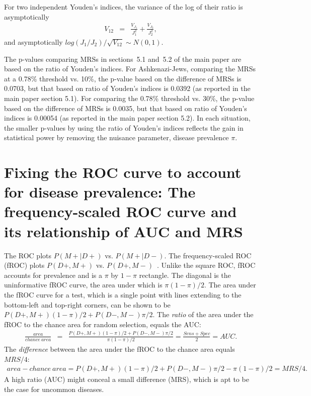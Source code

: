 \documentclass[AMA,STIX1COL]{WileyNJD-v2}
\begin{document}
For two independent Youden's indices, the variance of the log of their ratio is asymptotically
\begin{eqnarray*}
	V_{12} &=& \frac{V_{J_1}}{J_1^2} + \frac{V_{J_2}}{J_2^2},
\end{eqnarray*}
and asymptotically $log(J_1/J_2)/\sqrt{V_{12}}\sim N(0,1)$.

The p-values comparing MRSs in sections~5.1 and~5.2 of the main paper are based on the ratio of Youden's indices.  For Ashkenazi-Jews, comparing the MRSs at a 0.78\% threshold vs. 10\%, the p-value based on the difference of MRSs is 0.0703, but that based on ratio of Youden's indices is 0.0392 (as reported in the main paper section 5.1).  For comparing the 0.78\% threshold vs. 30\%, the p-value based on the difference of MRSs is 0.0035, but that based on ratio of Youden's indices is 0.00054 (as reported in the main paper section 5.2).  In each situation, the smaller p-values by using the ratio of Youden's indices reflects the gain in statistical power by removing the nuisance parameter, disease prevalence $\pi$.


\section{Fixing the ROC curve to account for disease prevalence: The frequency-scaled ROC curve and its relationship of AUC and MRS}
\label{fROC}

The ROC plots $P(M+|D+)$ vs. $P(M+|D-)$.  The frequency-scaled ROC (fROC) plots $P(D+,M+)$ vs. $P(D+,M-)$~\citep{Hilden1991}.  Unlike the square ROC, fROC accounts for prevalence and is a $\pi$ by $1-\pi$ rectangle.  The diagonal is the uninformative fROC curve, the area under which is $\pi(1-\pi)/2$.  The area under the fROC curve for a test, which is a single point with lines extending to the bottom-left and top-right corners, can be shown to be $P(D+,M+)(1-\pi)/2 + P(D-,M-)\pi/2$.  The \textit{ratio} of the area under the fROC to the chance area for random selection, equals the AUC:
\begin{eqnarray*}
	\frac{area}{chance~area} &=& \frac{P(D+,M+)(1-\pi)/2 + P(D-,M-)\pi/2}{\pi(1-\pi)/2} = \frac{Sens+Spec}{2} = AUC.
\end{eqnarray*} 
The \textit{difference} between the area under the fROC to the chance area equals $MRS/4$:
\begin{eqnarray*}
	area-chance~area = P(D+,M+)(1-\pi)/2 + P(D-,M-)\pi/2-\pi(1-\pi)/2 = MRS/4.
\end{eqnarray*} 
A high ratio (AUC) might conceal a small difference (MRS), which is apt to be the case for uncommon diseases.
\end{document}
